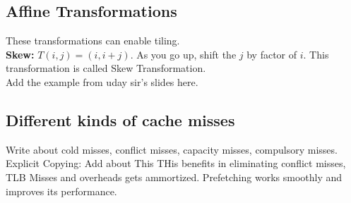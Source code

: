\documentclass{article}
\begin{document}
\subsection*{Affine Transformations}
These transformations can enable tiling. \\
\textbf{Skew: } $T(i,j) = (i,i+j)$. As you go up, shift the $j$ by factor of $i$. This transformation is called Skew Transformation. \\ 
Add the example from uday sir's slides here. \\

\subsection*{Different kinds of cache misses}
Write about cold misses, conflict misses, capacity misses, compulsory misses. \\

Explicit Copying: Add about This
THis benefits in eliminating conflict misses, TLB Misses and overheads gets ammortized. Prefetching works smoothly and improves its performance. \\
\end{document}
